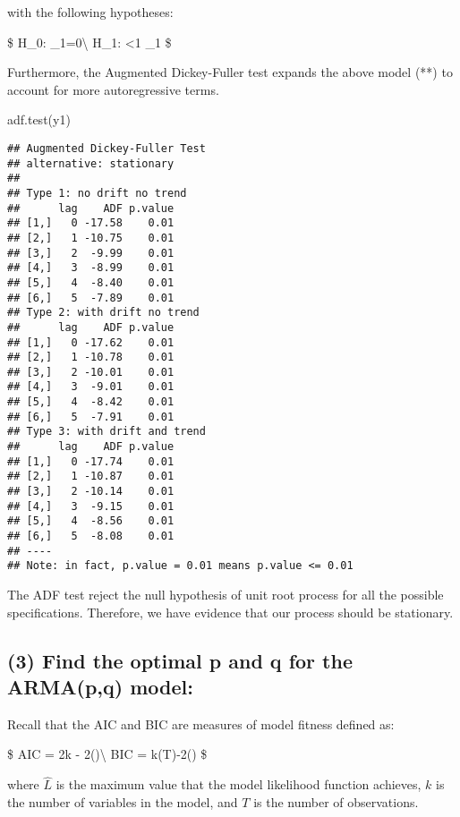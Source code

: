 \documentclass[]{article}
\newenvironment{Shaded}{\begin{snugshade}}{\end{snugshade}}
\newcommand{\FunctionTok}[1]{\textcolor[rgb]{0.00,0.00,0.00}{#1}}
\newcommand{\NormalTok}[1]{#1}
\begin{document}
with the following hypotheses:

\$ H\_0:  \quad \nu\_1=0\textbackslash{} H\_1:
\textbar{}\rho\textbar\textless1 \quad \nu\_1  \$

Furthermore, the Augmented Dickey-Fuller test expands the above model
(**) to account for more autoregressive terms.

\begin{Shaded}
\begin{Highlighting}[]
\FunctionTok{adf.test}\NormalTok{(y1)}
\end{Highlighting}
\end{Shaded}

\begin{verbatim}
## Augmented Dickey-Fuller Test 
## alternative: stationary 
##  
## Type 1: no drift no trend 
##      lag    ADF p.value
## [1,]   0 -17.58    0.01
## [2,]   1 -10.75    0.01
## [3,]   2  -9.99    0.01
## [4,]   3  -8.99    0.01
## [5,]   4  -8.40    0.01
## [6,]   5  -7.89    0.01
## Type 2: with drift no trend 
##      lag    ADF p.value
## [1,]   0 -17.62    0.01
## [2,]   1 -10.78    0.01
## [3,]   2 -10.01    0.01
## [4,]   3  -9.01    0.01
## [5,]   4  -8.42    0.01
## [6,]   5  -7.91    0.01
## Type 3: with drift and trend 
##      lag    ADF p.value
## [1,]   0 -17.74    0.01
## [2,]   1 -10.87    0.01
## [3,]   2 -10.14    0.01
## [4,]   3  -9.15    0.01
## [5,]   4  -8.56    0.01
## [6,]   5  -8.08    0.01
## ---- 
## Note: in fact, p.value = 0.01 means p.value <= 0.01
\end{verbatim}

The ADF test reject the null hypothesis of unit root process for all the
possible specifications. Therefore, we have evidence that our process
should be stationary.

\hypertarget{find-the-optimal-p-and-q-for-the-armapq-model}{%
\subsection{\texorpdfstring{\textbf{(3)} Find the optimal p and q for
the ARMA(p,q)
model:}{(3) Find the optimal p and q for the ARMA(p,q) model:}}\label{find-the-optimal-p-and-q-for-the-armapq-model}}

Recall that the AIC and BIC are measures of model fitness defined as:

\$ AIC = 2k - 2\log()\textbackslash{} BIC =
k\log(T)-2\log() \$

where \(\hat{L}\) is the maximum value that the model likelihood
function achieves, \(k\) is the number of variables in the model, and
\(T\) is the number of observations.
\end{document}
